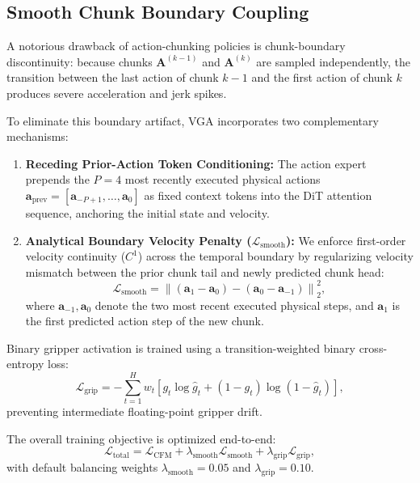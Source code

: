 \subsection{Smooth Chunk Boundary Coupling}
A notorious drawback of action-chunking policies is chunk-boundary discontinuity: because chunks $\mathbf{A}^{(k-1)}$ and $\mathbf{A}^{(k)}$ are sampled independently, the transition between the last action of chunk $k-1$ and the first action of chunk $k$ produces severe acceleration and jerk spikes.

To eliminate this boundary artifact, VGA incorporates two complementary mechanisms:
\begin{enumerate}
    \item \textbf{Receding Prior-Action Token Conditioning:} The action expert prepends the $P=4$ most recently executed physical actions $\mathbf{a}_{\text{prev}} = [\mathbf{a}_{-P+1}, \dots, \mathbf{a}_0]$ as fixed context tokens into the DiT attention sequence, anchoring the initial state and velocity.
    \item \textbf{Analytical Boundary Velocity Penalty ($\mathcal{L}_{\text{smooth}}$):} We enforce first-order velocity continuity ($C^1$) across the temporal boundary by regularizing velocity mismatch between the prior chunk tail and newly predicted chunk head:
    \begin{equation}
    \mathcal{L}_{\text{smooth}} = \left\| (\mathbf{a}_1 - \mathbf{a}_0) - (\mathbf{a}_0 - \mathbf{a}_{-1}) \right\|_2^2,
    \end{equation}
    where $\mathbf{a}_{-1}, \mathbf{a}_0$ denote the two most recent executed physical steps, and $\mathbf{a}_1$ is the first predicted action step of the new chunk.
\end{enumerate}

Binary gripper activation is trained using a transition-weighted binary cross-entropy loss:
\begin{equation}
\mathcal{L}_{\text{grip}} = -\sum_{t=1}^H w_t \left[ g_t \log \hat{g}_t + (1 - g_t) \log (1 - \hat{g}_t) \right],
\end{equation}
preventing intermediate floating-point gripper drift.

The overall training objective is optimized end-to-end:
\begin{equation}
\mathcal{L}_{\text{total}} = \mathcal{L}_{\text{CFM}} + \lambda_{\text{smooth}} \mathcal{L}_{\text{smooth}} + \lambda_{\text{grip}} \mathcal{L}_{\text{grip}},
\end{equation}
with default balancing weights $\lambda_{\text{smooth}} = 0.05$ and $\lambda_{\text{grip}} = 0.10$.

